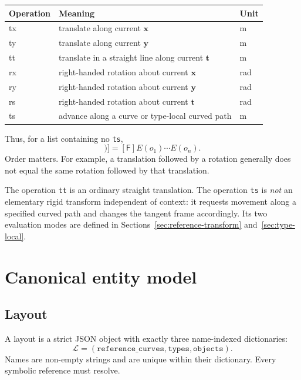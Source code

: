 \documentclass[11pt,a4paper]{article}
\newcommand{\Frame}{\mathsf{F}}
\newcommand{\Apply}{\operatorname{Apply}}
\begin{document}
\begin{center}
\begin{tabular}{>{\ttfamily}l l l}
\toprule
\normalfont Operation & Meaning & Unit \\
\midrule
tx & translate along current $\mathbf{x}$ & m \\
ty & translate along current $\mathbf{y}$ & m \\
tt & translate in a straight line along current $\mathbf{t}$ & m \\
rx & right-handed rotation about current $\mathbf{x}$ & rad \\
ry & right-handed rotation about current $\mathbf{y}$ & rad \\
rs & right-handed rotation about current $\mathbf{t}$ & rad \\
ts & advance along a curve or type-local curved path & m \\
\bottomrule
\end{tabular}
\end{center}

Thus, for a list containing no \texttt{ts},
\begin{equation}
 [\Apply(\Frame,[o_1,\ldots,o_n])]
 = [\Frame]E(o_1)\cdots E(o_n).
 \label{eq:ordered-ops}
\end{equation}
Order matters.  For example, a translation followed by a rotation generally
does not equal the same rotation followed by that translation.

The operation \texttt{tt} is an ordinary straight translation.  The operation
\texttt{ts} is \emph{not} an elementary rigid transform independent of context:
it requests movement along a specified curved path and changes the tangent
frame accordingly.  Its two evaluation modes are defined in
Sections~\ref{sec:reference-transform} and~\ref{sec:type-local}.

\section{Canonical entity model}

\subsection{Layout}

A layout is a strict JSON object with exactly three name-indexed dictionaries:
\begin{equation}
  \mathcal{L}=(\texttt{reference\_curves},\texttt{types},\texttt{objects}).
\end{equation}
Names are non-empty strings and are unique within their dictionary.  Every
symbolic reference must resolve.
\end{document}
